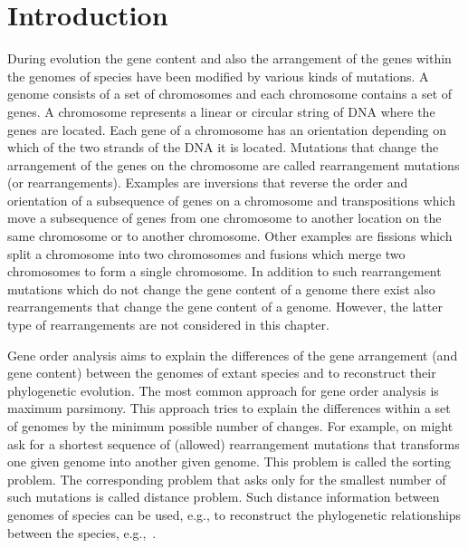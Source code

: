 \documentclass{svmult}
\begin{document}
\maketitle



\section{Introduction}

During evolution the gene content and also the arrangement of the genes within the genomes of species 
have been modified by various kinds of mutations. 
A genome consists of a set of chromosomes and each chromosome contains a set of genes. A chromosome represents 
a linear or circular string of DNA where the genes are located. Each gene of a chromosome has an orientation 
depending on which of the two strands of the DNA it is located. 
Mutations that change the arrangement of the genes on the
chromosome are called rearrangement mutations (or rearrangements). Examples are inversions that reverse the order and orientation 
of a subsequence of genes on a chromosome and transpositions 
which move a subsequence of genes from one chromosome to another location on the same chromosome or to another chromosome.
Other examples are fissions which split a chromosome into two chromosomes and fusions which merge two chromosomes to form a 
single chromosome. In addition to such rearrangement mutations which do not change the gene content of a genome there exist also 
rearrangements that change the gene content of a genome. However,
the latter type of rearrangements are not considered in this chapter.

Gene order analysis aims to explain the differences of the gene arrangement (and gene content) between the genomes of extant species 
and to reconstruct their phylogenetic evolution. The most common approach for
gene order analysis is maximum parsimony. This approach tries to explain the differences within a set of genomes by the minimum
possible number of changes. For example, on might ask for a shortest sequence of (allowed) rearrangement mutations that transforms one given genome into another given genome. This problem is called the sorting problem. The corresponding problem that asks only for the smallest number of such mutations is called distance problem. 
Such distance information between genomes of species can be used, e.g., to reconstruct the phylogenetic relationships between the species, 
e.g.,~\cite{Wang_2006}.
\end{document}
